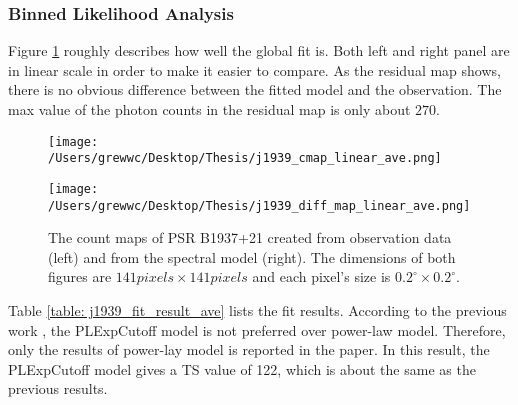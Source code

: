 \documentclass[12pt]{report}
\begin{document}
          \subsubsection{Binned Likelihood Analysis}
            Figure \ref{fig: j1939_count_map_diff_ave} roughly describes how well the global fit 
            is. Both left and right panel are in linear scale in order to make it easier to 
            compare. As the residual map shows, there is no obvious difference between the fitted 
            model and the observation. The max value of the photon counts in the residual map 
            is only about $270$. 
            \begin{figure}[!ht]
              \begin{center}
              \begin{minipage}{0.45\textwidth}
                \begin{center} 
                  \texttt{[image: /Users/grewwc/Desktop/Thesis/j1939\_cmap\_linear\_ave.png]}
                \end{center}
              \end{minipage}
              \begin{minipage}{0.45\textwidth}
                \begin{center}
                  \texttt{[image: /Users/grewwc/Desktop/Thesis/j1939\_diff\_map\_linear\_ave.png]}
                \end{center}
              \end{minipage}
              \end{center}

              \caption{The count maps of PSR B1937+21 created from observation 
                data (\textsf{left}) and from the spectral model (\textsf{right}). The dimensions
                of both figures are $141 pixels \times 141 pixels$ and each pixel's size is
                $0.2^{\circ}\times0.2^{\circ}$.}
              \label{fig: j1939_count_map_diff_ave}
            \end{figure}

            Table \ref{table: j1939_fit_result_ave} lists the fit results. According to the 
            previous work \cite{0004-637X-787-2-167}, the PLExpCutoff model is not 
            preferred over power-law model. Therefore, only the results of power-lay model is 
            reported in the paper. In this result, the PLExpCutoff model gives a TS value of 122,
            which is about the same as the previous results. 
\end{document}
